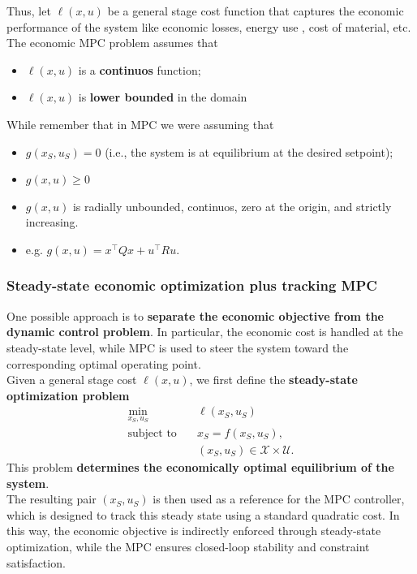 Thus, let $\ell(x,u)$ be a general stage cost function that captures the economic performance of the system like economic losses, energy use , cost of material, etc. The economic MPC problem assumes that
\begin{itemize}
    \item $\ell(x,u)$ is a \textbf{continuos} function;
    \item $\ell(x,u)$ is \textbf{lower bounded} in the domain
\end{itemize}
While remember that in MPC we were assuming that
\begin{itemize}
    \item $g(x_S,u_S) = 0$ (i.e., the system is at equilibrium at the desired setpoint);
    \item $g(x,u)\geq 0$
    \item $g(x,u)$ is radially unbounded, continuos, zero at the origin, and strictly increasing.
    \item e.g. $g(x,u) = x^\top Q x + u^\top R u$.
\end{itemize}
\subsubsection{Steady-state economic optimization plus tracking MPC}
One possible approach is to \textbf{separate the economic objective from the dynamic control problem}. In particular, the economic cost is handled at the steady-state level, while MPC is used to steer the system toward the corresponding optimal operating point.\\
Given a general stage cost $\ell(x,u)$, we first define the \textbf{steady-state optimization problem}
\[
\begin{aligned}
\min_{x_S,u_S} \quad & \ell(x_S,u_S) \\
\text{subject to} \quad & x_S = f(x_S,u_S), \\
& (x_S,u_S) \in \mathcal{X} \times \mathcal{U}.
\end{aligned}
\]
This problem \textbf{determines the economically optimal equilibrium of the system}.\\

The resulting pair $(x_S,u_S)$ is then used as a reference for the MPC controller, which is designed to track this steady state using a standard quadratic cost. In this way, the economic objective is indirectly enforced through steady-state optimization, while the MPC ensures closed-loop stability and constraint satisfaction.\\


